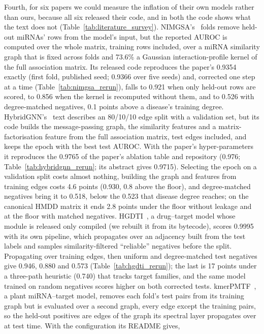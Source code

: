 \documentclass[review]{elsarticle}
\begin{document}
Fourth, for six papers we could measure the inflation of their own models rather than ours, because all six
released their code, and in both the code shows what the text does not (Table~\ref{tab:literature_survey}).
NIMGSA's~\cite{jin2022nimgsa} folds remove held-out miRNAs' rows from the model's input, but the reported
AUROC is computed over the whole matrix, training rows included, over a miRNA similarity graph that is fixed
across folds and 73.6\% a Gaussian interaction-profile kernel of the full association matrix. Its released
code reproduces the paper's 0.9354 exactly (first fold, published seed; 0.9366 over five seeds) and,
corrected one step at a time (Table~\ref{tab:nimgsa_rerun}), falls to 0.921 when only held-out rows are
scored, to 0.856 when the kernel is recomputed without them, and to 0.526 with degree-matched negatives,
0.1 points above a disease's training degree. HybridGNN's~\cite{ahmad2026hybridgnn} text describes an
80/10/10 edge split with a validation set, but its code builds the message-passing graph, the similarity
features and a matrix-factorisation feature from the full association matrix, test edges included, and
keeps the epoch with the best test AUROC. With the paper's hyper-parameters it reproduces the 0.9765 of
the paper's ablation table and repository (0.976; Table~\ref{tab:hybridgnn_rerun}; its abstract gives 0.9715). Selecting the epoch on a
validation split costs almost nothing, building the graph and features from training edges costs 4.6
points (0.930, 0.8 above the floor), and degree-matched negatives bring it to 0.518, below the 0.523 that
disease degree reaches; on the canonical HMDD matrix it ends 2.8 points under the floor without leakage
and at the floor with matched negatives. HGDTI~\cite{yu2022hgdti}, a drug--target model whose module is released
only compiled (we rebuilt it from its bytecode), scores 0.9995 with its own pipeline, which propagates over an
adjacency built from the test labels and samples similarity-filtered ``reliable'' negatives before the split.
Propagating over training edges, then uniform and degree-matched test negatives give 0.946, 0.880 and 0.573
(Table~\ref{tab:hgdti_rerun}); the last is 17 points under a three-path heuristic (0.740) that tracks target
families, and the same model trained on random negatives scores higher on both corrected tests.
kmerPMTF~\cite{zhang2024kmerpmtf}, a plant miRNA--target model, removes each fold's test pairs from its training
graph but is evaluated over a second graph, every edge except the training pairs, so the held-out positives are
edges of the graph its spectral layer propagates over at test time. With the configuration its README gives,
\end{document}
